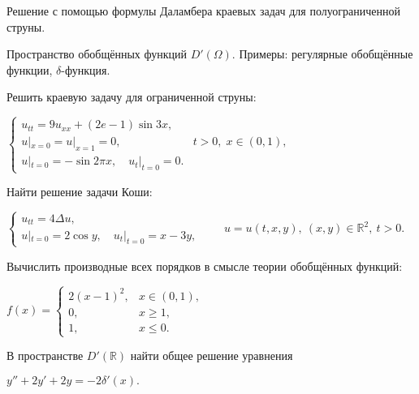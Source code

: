 
\begin{cond}
	Решение с помощью формулы Даламбера краевых задач для полуограниченной струны.
\end{cond}

\begin{cond}
	Пространство обобщённых функций $D'(\Omega)$. Примеры: регулярные обобщённые функции, $\delta$-функция.
\end{cond}

\begin{cond}
	Решить краевую задачу для ограниченной струны:

	\(
	\begin{cases}
		u_{tt} = 9u_{xx} + (2e - 1)\sin 3x,              \\
		u|_{x=0} = u|_{x=1} = 0, & t > 0,\; x \in (0,1), \\
		u|_{t=0} = -\sin 2\pi x,\quad u_t|_{t=0} = 0.
	\end{cases}
	\)
\end{cond}

\begin{cond}
	Найти решение задачи Коши:

	\(
	\begin{cases}
		u_{tt} = 4\Delta u, \\
		u|_{t=0} = 2\cos y,\quad u_t|_{t=0} = x - 3y,
	\end{cases}
	\qquad
	u = u(t,x,y),\ (x,y)\in\mathbb{R}^2,\ t>0.
	\)
\end{cond}

\begin{sol}

\end{sol}

\begin{out}

\end{out}

\begin{cond}
	Вычислить производные всех порядков в смысле теории обобщённых функций:

	\(
	f(x) =
	\begin{cases}
		2(x-1)^2, & x \in (0,1), \\
		0,        & x \ge 1,     \\
		1,        & x \le 0.
	\end{cases}
	\)
\end{cond}

\begin{cond}
	В пространстве \(D'(\mathbb{R})\) найти общее решение уравнения

	\(
	y'' + 2y' + 2y = -2\delta'(x).
	\)
\end{cond}
